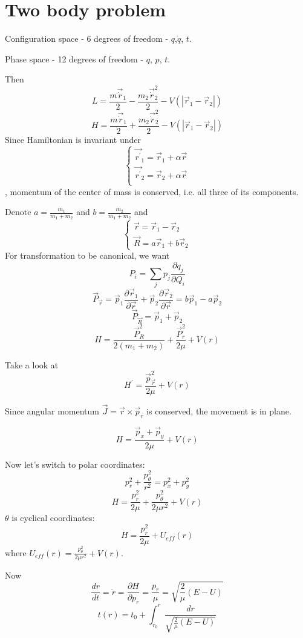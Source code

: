 \section{Two body problem}
Configuration space - 6 degrees of freedom - $q$,$\dot{q}$, $t$.

Phase space - 12 degrees of freedom - $q$, $p$, $t$.

Then
$$L = \frac{m\vec{\dot{r}}_1}{2} - \frac{m_2\vec{\dot{r}}_2^2}{2} - V(|\vec{r}_1 - \vec{r}_2|)$$
$$H = \frac{m\vec{\dot{r}}_1}{2} + \frac{m_2\vec{\dot{r}}_2^2}{2} - V(|\vec{r}_1 - \vec{r}_2|)$$
Since Hamiltonian is invariant under $$\begin{cases}
\vec{r^\prime}_1 = \vec{r}_1 + \alpha \vec{r} \\
\vec{r^\prime}_2 = \vec{r}_2 + \alpha \vec{r} \\
\end{cases}$$, momentum of the center of mass is conserved, i.e. all three of its components.

Denote $a=\frac{m_1}{m_1+m_2}$ and $b=\frac{m_2}{m_1+m_2}$ and 
$$\begin{cases}
\vec{r} = \vec{r}_1 - \vec{r}_2\\
\vec{R} = a\vec{r}_1 + b\vec{r}_2
\end{cases}$$
For transformation to be canonical, we want
$$P_i = \sum_j p_j \frac{\partial q_j}{\partial Q_i}$$
$$\vec{P}_{\vec{r}} = \vec{p}_1 \frac{\partial \vec{r}_1}{\partial \vec{r}} +  \vec{p}_2 \frac{\partial \vec{r}_2}{\partial \vec{r}} = b\vec{p}_1 - a\vec{p}_2$$
$$\vec{P}_{\vec{R}} = \vec{p}_1 + \vec{p}_2$$
$$H = \frac{\vec{P}_R^2}{2(m_1+m_2)} + \frac{\vec{P}_r^2}{2\mu}+V(r)$$

Take a look at 
$$H^\prime = \frac{\vec{p}_{\vec{r}}^2}{2\mu} + V(r)$$

Since angular momentum $\vec{J} = \vec{r} \times \vec{p}_r$ is conserved, the movement is in plane.

$$H = \frac{\vec{p}_x + \vec{p}_y}{2\mu} + V(r)$$

Now let's switch to polar coordinates:
$$p^2_r + \frac{p^2_\theta}{r^2} = p^2_x + p^2_y$$
$$H = \frac{p^2_r}{2\mu} + \frac{p^2_\theta}{2\mu r^2} +V(r)$$
$\theta$ is cyclical coordinates:
$$H = \frac{p^2_r}{2\mu} + U_{eff}(r)$$
where $U_{eff}(r) = \frac{p_\theta^2 }{2\mu r^2} + V(r)$.

Now
$$\frac{dr}{dt} = \dot{r} = \frac{\partial H}{\partial p_r} = \frac{p_r}{\mu} = \sqrt{\frac{2}{\mu} (E-U)}$$
$$t(r) = t_0 + \int_{r_0}^r \frac{dr}{\sqrt{\frac{2}{\mu} (E-U)}}$$
